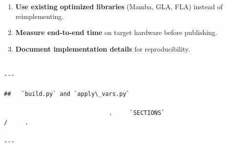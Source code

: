 \begin{enumerate}
\item \textbf{Use existing optimized libraries} (Mamba, GLA, FLA) instead of
  reimplementing.
\item \textbf{Measure end-to-end time} on target hardware before publishing.
\item \textbf{Document implementation details} for reproducibility.
\end{enumerate}
\begin{lstlisting}

---

##   `build.py` and `apply\_vars.py`

                              .     `SECTIONS`                                 /     .

---
\end{lstlisting}

